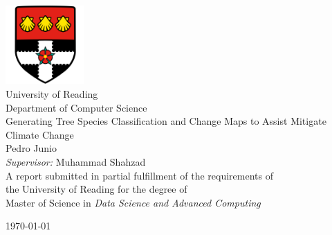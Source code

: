 \begin{titlepage}      
        \begin{center}
            \includegraphics[width=3cm]{figures/figures_misc/uorlogo.png}\\[0.5cm]
            {\LARGE University of Reading\\[0.5cm]
            Department of Computer Science}\\[2cm]
			
            \linespread{1.2}\huge {
                Generating Tree Species Classification and Change Maps to Assist Mitigate Climate Change
            }
            \linespread{1}~\\[2cm]
            {\Large 
                Pedro Junio
            }\\[1cm] 
            

            {\large 
                \emph{Supervisor:} Muhammad Shahzad}\\[1cm] %
            
            \large A report submitted in partial fulfillment of the requirements of\\the University of Reading for the degree of\\ Master of Science in \textit{Data Science and Advanced Computing}\\[0.3cm] 
            \vfill
            
            \today 
        \end{center}
    \end{titlepage}